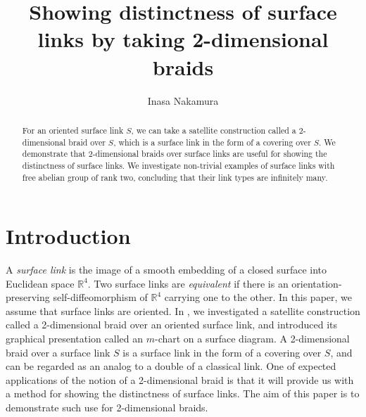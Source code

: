 \documentclass[a4paper,11pt]{amsart}
\title{Showing distinctness of surface links by taking 2-dimensional braids}
\author{Inasa Nakamura}
\numberwithin{equation}{section}
\begin{document}
\maketitle

\begin{abstract}
For an oriented surface link $S$, 
we can take a satellite construction called a 2-dimensional braid over $S$, which is a surface link in the form of a covering over $S$. 
We demonstrate that 2-dimensional braids over surface links are useful for showing the distinctness of surface links. 
We investigate non-trivial examples of surface links with free abelian group of rank two, concluding that their link types are infinitely many. 
\end{abstract}

\section{Introduction}

A {\it surface link} is the image of a smooth embedding of a closed surface into Euclidean space $\mathbb{R}^4$.  Two surface links are {\it equivalent} if there is an orientation-preserving self-diffeomorphism of $\mathbb{R}^4$ carrying one to the other. 
In this paper, we assume that surface links are oriented. 
In \cite{N4}, we investigated a satellite construction called a 2-dimensional braid over an oriented surface link, and introduced its graphical presentation called an $m$-chart on a surface diagram. 
A 2-dimensional braid over a surface link $S$ is a surface link in the form of a covering over $S$, and can be regarded as an analog to a double of a classical link. 
One of expected applications of the notion of a 2-dimensional braid is that it will provide us with a method for showing the distinctness of surface links. 
The aim of this paper is to demonstrate such use for 2-dimensional braids.
\end{document}
